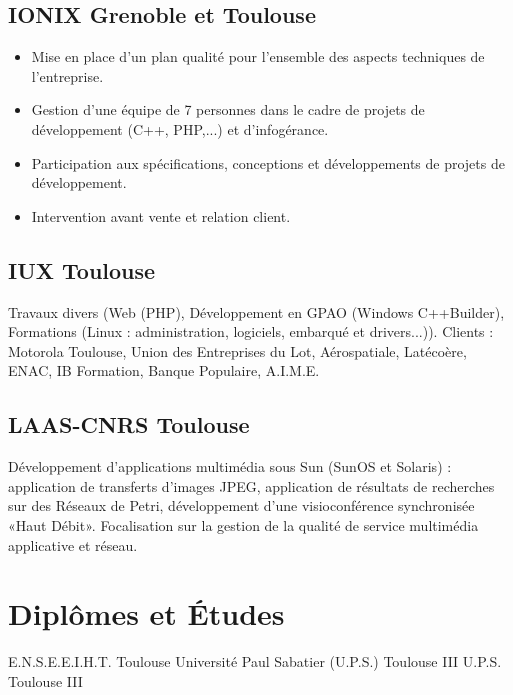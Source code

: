 \documentclass[10pt,a4paper]{moderncv}
\begin{document}
\subsection{IONIX Grenoble et Toulouse}
          { \begin{itemize}
              \item Mise en place d'un plan qualité pour l'ensemble des aspects techniques de l'entreprise.
              \item Gestion d'une équipe de 7 personnes dans le cadre de projets de développement (C++, PHP,...) et d'infogérance. 
              \item Participation aux spécifications, conceptions et développements de projets de développement.
              \item Intervention avant vente et relation client. 
            \end{itemize}
          }
\subsection{IUX Toulouse}
          {Travaux divers (Web (PHP), Développement en GPAO (Windows C++Builder), Formations (Linux : administration, logiciels, embarqué et drivers...)).
Clients : Motorola Toulouse, Union des Entreprises du Lot, Aérospatiale, Latécoère, ENAC, IB Formation, Banque Populaire, A.I.M.E.}          
\subsection{LAAS-CNRS Toulouse}
          {Développement d'applications multimédia sous Sun (SunOS et Solaris) : application de transferts d'images JPEG, application de résultats de recherches sur des Réseaux de Petri, développement d'une visioconférence synchronisée «Haut Débit». Focalisation sur la gestion de la qualité de service multimédia applicative et réseau.}

\section{Diplômes et Études}
          {E.N.S.E.E.I.H.T.}
          {Toulouse}{}{}        
          {Université Paul Sabatier (U.P.S.) Toulouse III}{}{}{}        
          {U.P.S. Toulouse III}{}{}
          {
          }
\end{document}
